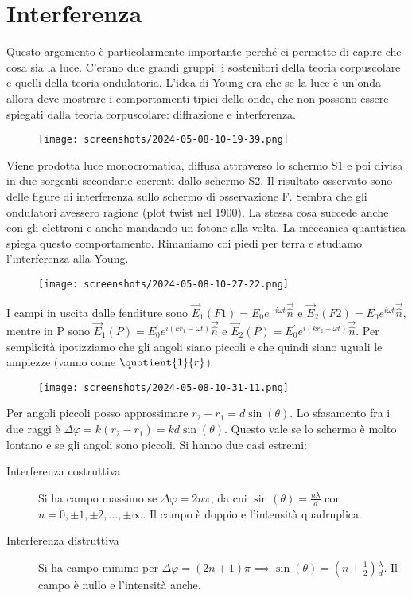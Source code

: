 \section{Interferenza}
Questo argomento è particolarmente importante perché ci permette di capire che cosa sia la luce. C'erano due grandi gruppi: i sostenitori della teoria corpuscolare e quelli della teoria ondulatoria. L'idea di Young era che se la luce è un'onda allora deve mostrare i comportamenti tipici delle onde, che non possono essere spiegati dalla teoria corpuscolare: diffrazione e interferenza.
\begin{figure}[H]
	\centering
	\texttt{[image: screenshots/2024-05-08-10-19-39.png]}
\end{figure}
Viene prodotta luce monocromatica, diffusa attraverso lo schermo S1 e poi divisa in due sorgenti secondarie coerenti dallo schermo S2. Il risultato osservato sono delle figure di interferenza sullo schermo di osservazione F. Sembra che gli ondulatori avessero ragione (plot twist nel 1900). La stessa cosa succede anche con gli elettroni e anche mandando un fotone alla volta. La meccanica quantistica spiega questo comportamento. Rimaniamo coi piedi per terra e studiamo l'interferenza alla Young.
\begin{figure}[H]
	\centering
	\texttt{[image: screenshots/2024-05-08-10-27-22.png]}
\end{figure}
I campi in uscita dalle fenditure sono \(\vec{E}_1 (F1) = E_0 e^{-i \omega t} \vec{\hat{n}}\) e \(\vec{E}_2(F2) = E_0 e^{i \omega t} \vec{\hat{n}}\), mentre in P sono \(\vec{E}_1 (P) = E_0^{\prime} e^{i(kr_1 - \omega t)} \vec{\hat{n}}\) e \(\vec{E}_2 (P) = E_0^{\prime} e^{i (kr_2 - \omega t)} \vec{\hat{n}}\). Per semplicità ipotizziamo che gli angoli siano piccoli e che quindi siano uguali le ampiezze (vanno come \(\quotient{1}{r} \)).
\begin{figure}[H]
	\centering
	\texttt{[image: screenshots/2024-05-08-10-31-11.png]}
\end{figure}
Per angoli piccoli posso approssimare \(r_2 - r_1 = d \sin (\theta )\). Lo sfasamento fra i due raggi è \(\Delta \varphi = k (r_2 - r_1) = kd \sin (\theta )\). Questo vale se lo schermo è molto lontano e se gli angoli sono piccoli. Si hanno due casi estremi:
\begin{description}
	\item[Interferenza costruttiva] Si ha campo massimo se \(\Delta \varphi = 2n \pi\), da cui \(\sin (\theta ) = \frac{n \lambda }{d} \) con \(n=0, \pm 1, \pm 2, \dots , \pm \infty \). Il campo è doppio e l'intensità quadruplica.
	\item[Interferenza distruttiva] Si ha campo minimo per \(\Delta \varphi = (2n + 1) \pi \implies \sin (\theta ) = (n + \frac{1}{2}) \frac{\lambda }{d}\). Il campo è nullo e l'intensità anche.
\end{description}
